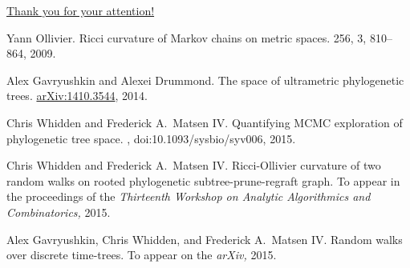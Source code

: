 \documentclass{beamer}
\begin{document}
\begin{frame}{\href{http://alex.gavruskin.com/pictures/}{\Large{Thank
you for your attention!}}}


\scriptsize

Yann Ollivier.
\newblock Ricci curvature of Markov chains on metric spaces.
 256, 3, 810--864, 2009.

Alex Gavryushkin and Alexei Drummond.
\newblock The space of ultrametric phylogenetic trees.
 \href{http://arxiv.org/abs/1410.3544}{arXiv:1410.3544}, 2014.

Chris Whidden and Frederick A.\ Matsen IV.
\newblock Quantifying MCMC exploration of phylogenetic tree space.
, doi:10.1093/sysbio/syv006, 2015.

Chris Whidden and Frederick A.\ Matsen IV.
\newblock Ricci-Ollivier curvature of two random walks on rooted phylogenetic subtree-prune-regraft graph.
\newblock To appear in the proceedings of the {\em Thirteenth Workshop on Analytic Algorithmics and Combinatorics,} 2015.

Alex Gavryushkin, Chris Whidden, and Frederick A.\ Matsen IV.
\newblock Random walks over discrete time-trees.
\newblock To appear on the {\em arXiv,} 2015.

\end{frame}
\end{document}
